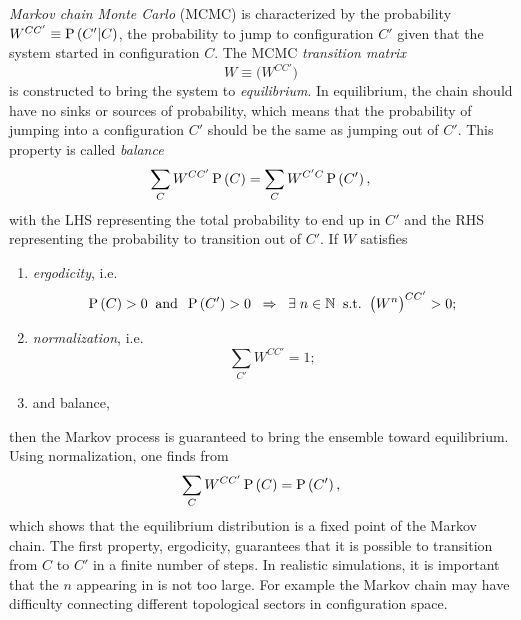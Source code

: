 {\it Markov chain Monte Carlo} (MCMC) is characterized by the probability 
$W^{CC'}\equiv\operatorname{P}\left(C'|C\right)$, the probability to jump to configuration 
$C'$ given that the system started in configuration $C$.
The MCMC {\it transition matrix}
\begin{equation}
  W\equiv\Big(W^{CC'}\Big)
\end{equation}
is constructed to bring the system to {\it equilibrium}.
In equilibrium, the chain should have no sinks or sources of probability,
which means that the probability of jumping into a configuration $C'$
should be the same as jumping out of $C'$. This property
is called {\it balance}
\begin{equation}\label{eq:balance}
    \sum\limits_CW^{CC'}\operatorname{P}\left(C\right)=
    \sum\limits_CW^{C'C}\operatorname{P}\left(C'\right),
\end{equation}
with the LHS representing the total probability to end up in $C'$ and
the RHS representing the probability to transition out of $C'$.
If $W$ satisfies
\begin{enumerate}
  \item {\it ergodicity}, i.e.
        \begin{equation}\label{eq:ergodicity}
          \operatorname{P}\left(C\right)>0\;\;\text{and}\;\;\operatorname{P}\left(C'\right)>0\;\;\Rightarrow\;\;
          \exists\;n\in\mathbb{N}\;\;\text{s.t.}\;\;\big(W^n\big)^{CC'}>0;
        \end{equation}
  \item {\it normalization}, i.e.
        \begin{equation}
          \sum\limits_{C'}W^{CC'}=1;
        \end{equation}
  \item and balance, 
\end{enumerate}
then the Markov process is guaranteed to bring the ensemble toward 
equilibrium. Using normalization, one finds from 
\begin{equation}\index{balance}
    \sum\limits_CW^{CC'}\pr{C}=\pr{C'},
\end{equation}
which shows that the equilibrium distribution is a fixed point of
the Markov chain. The first property, ergodicity, guarantees that it
is possible to transition from $C$ to $C'$ in a finite number of steps.
In realistic simulations, it is important that the $n$ appearing in
 is not too large. For example 
the Markov chain may have difficulty connecting different topological sectors
in configuration space.

